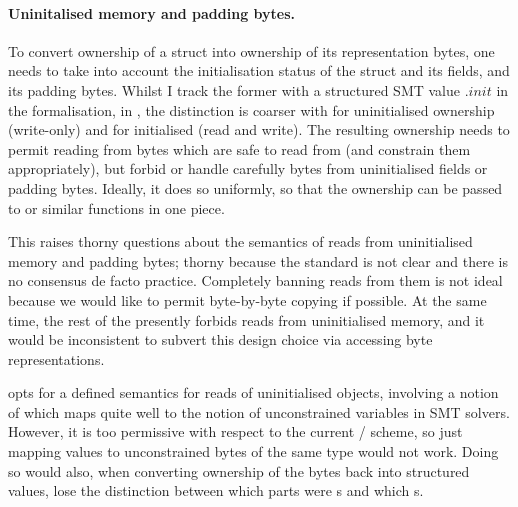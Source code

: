 \paragraph{Uninitalised memory and padding bytes.}%
To convert ownership of a struct into ownership of its representation bytes,
one needs to take into account the initialisation status of the struct and its
fields, and its padding bytes. Whilst I track the former with a structured SMT
value $.\mathit{init}$ in the formalisation, in , the distinction is
coarser with  for uninitialised ownership (write-only) and
 for initialised (read and write). The resulting ownership
needs to permit reading from bytes which are safe to read from (and constrain
them appropriately), but forbid or handle carefully bytes from uninitialised
fields or padding bytes. Ideally, it does so uniformly, so that the ownership
can be passed to  or similar functions in one piece.

This raises thorny questions about the semantics of reads from uninitialised
memory and padding bytes; thorny because the  standard is not clear and
there is no consensus de facto practice. Completely banning reads from them is
not ideal because we would like to permit byte-by-byte copying if possible. At
the same time, the rest of the  presently forbids reads from
uninitialised memory, and it
would be inconsistent to subvert this design choice via accessing byte
representations.

 opts for a defined semantics for reads of uninitialised objects,
involving a notion of  which maps quite well to
the notion of unconstrained variables in SMT solvers. However, it is too
permissive with respect to the current /
scheme, so just mapping  values to unconstrained
 bytes of the same type would not work. Doing so would also,
when converting ownership of the bytes back into structured values, lose the
distinction between which parts were s and which
s.

